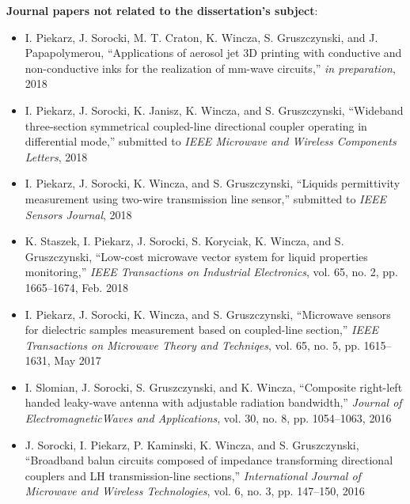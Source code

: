 \noindent \textbf{Journal papers not related to the dissertation's subject}:
\begin{itemize}[nosep]
\item I. Piekarz, J. Sorocki, M. T. Craton, K. Wincza, S. Gruszczynski, and J. Papapolymerou,
“Applications of aerosol jet 3D printing with conductive and non-conductive inks for the realization of mm-wave circuits,” \textit{in preparation}, 2018
\item I. Piekarz, J. Sorocki, K. Janisz, K. Wincza, and S. Gruszczynski, “Wideband three-section
symmetrical coupled-line directional coupler operating in differential mode,” submitted to \textit{IEEE Microwave and Wireless Components Letters}, 2018
\item I. Piekarz, J. Sorocki, K. Wincza, and S. Gruszczynski, “Liquids permittivity measurement using two-wire transmission line sensor,” submitted to \textit{IEEE Sensors Journal}, 2018
\item K. Staszek, I. Piekarz, J. Sorocki, S. Koryciak, K. Wincza, and S. Gruszczynski, “Low-cost
microwave vector system for liquid properties monitoring,” \textit{IEEE Transactions on Industrial Electronics}, vol. 65, no. 2, pp. 1665–1674, Feb. 2018
\item I. Piekarz, J. Sorocki, K. Wincza, and S. Gruszczynski, “Microwave sensors for dielectric samples measurement based on coupled-line section,” \textit{IEEE Transactions on Microwave Theory and Techniqes}, vol. 65, no. 5, pp. 1615–1631, May 2017
\item I. Slomian, J. Sorocki, S. Gruszczynski, and K. Wincza, “Composite right-left handed leaky-wave antenna with adjustable radiation bandwidth,” \textit{Journal of ElectromagneticWaves and Applications}, vol. 30, no. 8, pp. 1054–1063, 2016
\item J. Sorocki, I. Piekarz, P. Kaminski, K. Wincza, and S. Gruszczynski, “Broadband balun circuits composed of impedance transforming directional couplers and LH transmission-line sections,” \textit{International Journal of Microwave and Wireless Technologies}, vol. 6, no. 3, pp. 147–150, 2016

\end{itemize}

